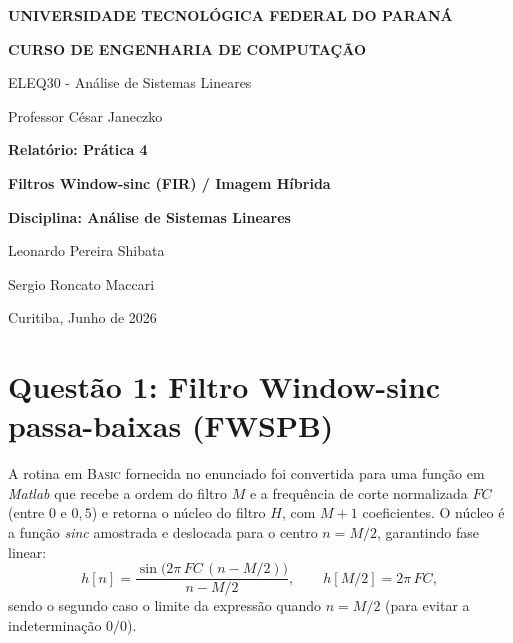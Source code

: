 \documentclass[12pt,a4paper]{article}
\begin{document}
\begin{titlepage}
\centering
{\large\bfseries UNIVERSIDADE TECNOL\'OGICA FEDERAL DO PARAN\'A\par}
{\large\bfseries CURSO DE ENGENHARIA DE COMPUTA\c{C}\~AO\par}
\vspace{0.4cm}
{\normalsize ELEQ30 - An\'alise de Sistemas Lineares\par}
{\normalsize Professor C\'esar Janeczko\par}

\vspace{3.2cm}
{\LARGE\bfseries Relat\'orio: Pr\'atica 4\par}
\vspace{0.4cm}
{\large\bfseries Filtros Window-sinc (FIR) / Imagem H\'ibrida\par}

\vspace{1.6cm}
{\large\bfseries Disciplina: An\'alise de Sistemas Lineares\par}

\vspace{2.8cm}
{\large Leonardo Pereira Shibata\par}
\vspace{0.2cm}
{\large Sergio Roncato Maccari\par}

\vfill
{\large Curitiba, Junho de 2026\par}
\end{titlepage}

\section*{Quest\~ao 1: Filtro Window-sinc passa-baixas (FWSPB)}

A rotina em \textsc{Basic} fornecida no enunciado foi convertida para uma fun\c{c}\~ao
em \textit{Matlab} que recebe a ordem do filtro $M$ e a frequ\^encia de corte normalizada
$FC$ (entre $0$ e $0{,}5$) e retorna o n\'ucleo do filtro $H$, com $M+1$ coeficientes.
O n\'ucleo \'e a fun\c{c}\~ao \textit{sinc} amostrada e deslocada para o centro
$n = M/2$, garantindo fase linear:
%
\begin{equation}
h[n] = \frac{\sin\!\big(2\pi\,FC\,(n - M/2)\big)}{n - M/2},
\qquad h[M/2] = 2\pi\,FC ,
\end{equation}
%
sendo o segundo caso o limite da express\~ao quando $n = M/2$ (para evitar a
indetermina\c{c}\~ao $0/0$).
\end{document}
